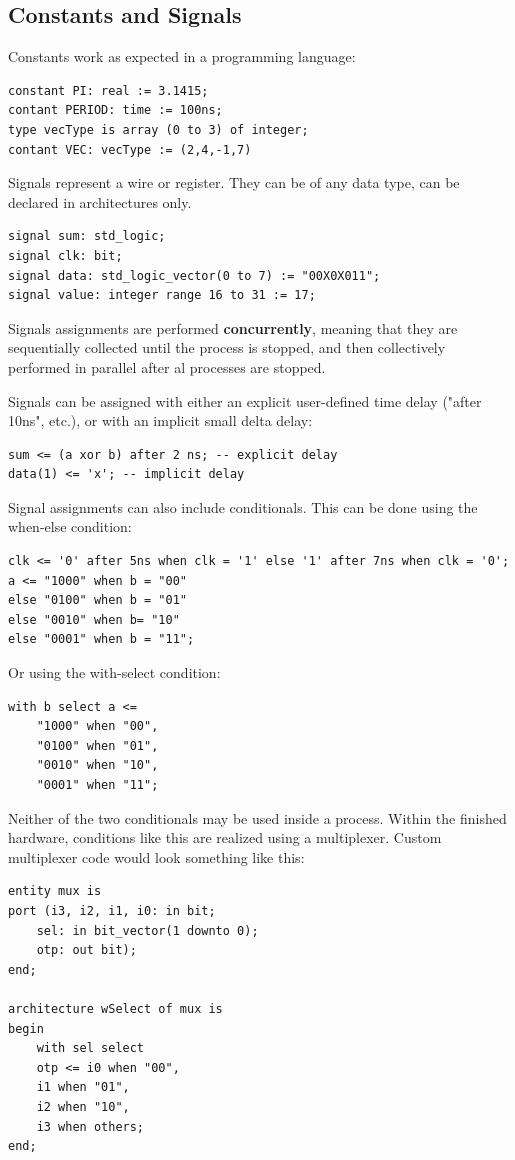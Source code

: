 \documentclass{report}
\newcommand{\tbf}{\textbf}
\newcommand*{\newpar}{\par\vspace{\baselineskip}\noindent} %
\begin{document}
\subsection{Constants and Signals}
Constants work as expected in a programming language:
\begin{verbatim}
constant PI: real := 3.1415;
contant PERIOD: time := 100ns;
type vecType is array (0 to 3) of integer;
contant VEC: vecType := (2,4,-1,7)
\end{verbatim}
Signals represent a wire or register. They can be of any data type, can be declared in architectures only.
\begin{verbatim}
signal sum: std_logic;
signal clk: bit;
signal data: std_logic_vector(0 to 7) := "00X0X011";
signal value: integer range 16 to 31 := 17;
\end{verbatim}
Signals assignments are performed \tbf{concurrently}, meaning that they are sequentially collected until the process is stopped, and then collectively performed in parallel after al processes are stopped.
\newpar
Signals can be assigned with either an explicit user-defined time delay ("after 10ns", etc.), or with an implicit small delta delay:
\begin{verbatim}
sum <= (a xor b) after 2 ns; -- explicit delay
data(1) <= 'x'; -- implicit delay
\end{verbatim}
Signal assignments can also include conditionals. This can be done using the when-else condition:
\begin{verbatim}
clk <= '0' after 5ns when clk = '1' else '1' after 7ns when clk = '0';
a <= "1000" when b = "00" 
else "0100" when b = "01" 
else "0010" when b= "10" 
else "0001" when b = "11";
\end{verbatim}
Or using the with-select condition:
\begin{verbatim}
with b select a <=
	"1000" when "00",
	"0100" when "01",
	"0010" when "10",
	"0001" when "11";
\end{verbatim}
Neither of the two conditionals may be used inside a process. Within the finished hardware, conditions like this are realized using a multiplexer. Custom multiplexer code would look something like this:
\begin{verbatim}
entity mux is
port (i3, i2, i1, i0: in bit;
    sel: in bit_vector(1 downto 0);
    otp: out bit);
end;    

architecture wSelect of mux is
begin
    with sel select
    otp <= i0 when "00",
    i1 when "01",
    i2 when "10",
    i3 when others;
end;
\end{verbatim}
\end{document}
